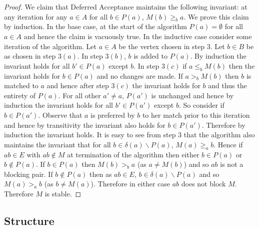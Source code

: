 \begin{proof}
We claim that Deferred Acceptance maintains the following invariant: at any iteration for any $a \in A$ for all $b \in P(a)$, $M(b) \geq_b a$. We prove this claim by induction. In the base case, at the start of the algorithm $P(a) = \emptyset$ for all $a \in A$ and hence the claim is vacuously true. In the inductive case consider some iteration of the algorithm. Let $a\in A$ be the vertex chosen in step $3$. Let $b \in B$ be as chosen in step $3(a)$. In step $3(b)$, $b$ is added to $P(a)$. By induction the invariant holds for all $b' \in P(a)$ except $b$. In step $3(c)$ if $a \leq_b M(b)$ then the invariant holds for $b \in P(a)$ and no changes are made. If $a >_b M(b)$ then $b$ is matched to $a$ and hence after step $3(c)$ the invariant holds for $b$ and thus the entirety of $P(a)$. For all other $a' \neq a$, $P(a')$ is unchanged and hence by induction the invariant holds for all $b' \in P(a')$ except $b$. So consider if $b \in P(a')$. Observe that $a$ is preferred by $b$ to her match prior to this iteration and hence by transitivity the invariant also holds for $b \in P(a')$. Therefore by induction the invariant holds. It is easy to see from step $3$ that the algorithm also maintains the invariant that for all $b \in \delta(a)\backslash P(a)$, $M(a) \geq_a b$. Hence if $ab \in E$ with $ab \not\in M$ at termination of the algorithm then either $b \in P(a)$ or $b \not\in P(a)$. If $b \in P(a)$ then $M(b) >_b a$ (as $a \neq M(b)$) and so $ab$ is not a blocking pair. If $b \not\in P(a)$ then as $ab \in E$, $b \in \delta(a) \backslash P(a)$ and so $M(a) >_a b$ (as $b \neq M(a)$). Therefore in either case $ab$ does not block $M$. Therefore $M$ is stable.
\end{proof}
\subsection{Structure}\label{SM:STRUCTURE}
